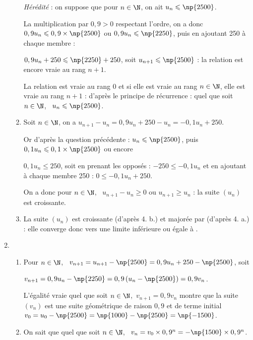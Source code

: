 \begin{enumerate}
\begin{enumerate}
\emph{Hérédité} : on suppose que pour $n \in \N$, on ait $u_n \leqslant \np{2500}$.

La multiplication par $0,9  > 0$ respectant l'ordre, on a donc $0,9u_n \leqslant 0,9 \times \np{2500}$ ou $0,9u_n \leqslant \np{2250}$, puis en ajoutant 250 à chaque membre :

$0,9u_n + 250 \leqslant \np{2250} + 250$, soit $u_{n+1} \leqslant \np{2500}$ : la relation est encore vraie au rang $n+1$.

La relation est vraie au rang $0$ et si elle est vraie au rang $n \in \N$, elle est vraie au rang $n + 1$ : d'après le principe de récurrence : quel que soit $n \in \N$, \, $u_n \leqslant \np{2500}$.
		\item %
Soit $n \in \N$, on a $u_{n+1} - u_n = 0,9u_n + 250 - u_n = -0,1u_n + 250$.

Or d'après la question précédente : $u_n \leqslant \np{2500}$, puis $0,1u_n \leqslant 0,1 \times \np{2500}$ ou encore 

$0,1u_n \leqslant 250$, soit en prenant les opposés : $- 250 \leqslant - 0,1u_n$ et en ajoutant à chaque membre 250 : $0 \leqslant -0,1u_n + 250$.

On a donc pour $n \in \N$, \, $u_{n+1} - u_n \geqslant 0$ ou $u_{n+1}  \geqslant u_n$ : la suite $\left(u_n\right)$ est croissante.
		\item %
La suite $\left(u_n\right)$ est croissante (d'après 4. b.) et majorée par  (d'après 4. a.) : elle converge donc vers une limite inférieure ou égale à .
	\end{enumerate}
\item %
	\begin{enumerate}
		\item %
		Pour $n \in \N$, \, $v_{n+1} = u_{n+1} - \np{2500} = 0,9u_n + 250 - \np{2500}$, soit 
		
$v_{n+1} = 0,9u_n - \np{2250} = 0,9\left(u_n  - \np{2500} \right) = 0,9v_n$.

L'égalité vraie quel que soit $n \in \N$,\, $v_{n+1} = 0,9v_n$ montre que la suite $\left(v_n\right)$ est une suite géométrique de raison $0,9$ et de terme initial $v_0 = u_0 - \np{2500} = \np{1000} - \np{2500}  =  \np{- 1500}$.
		\item %
On sait que quel que soit $n \in \N$, \, $v_n = v_0 \times 0,9^n = - \np{1500}\times 0,9^n$.
		

\end{enumerate}
\end{enumerate}
